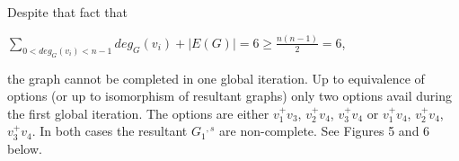 \documentclass[12pt]{amsart}
\numberwithin{equation}{section}
\numberwithin{equation}{section}
\begin{document}
Despite that fact that
\begin{center}
$\sum\limits_{0<deg_G(v_i) < n-1}deg_G(v_i) + |E(G)| = 6 \geq \frac{n(n-1)}{2} = 6$,
\end{center}
the graph cannot be completed in one global iteration. Up to equivalence of options (or up to isomorphism of resultant graphs) only two options avail during the first global iteration. The options are either $v^+_1v_3$, $v^+_2v_4$, $v^+_3v_4$ or $v^+_1v_4$, $v^+_2v_4$, $v^+_3v_4$. In both cases the resultant $G_1$$^{,s}$ are non-complete. See Figures 5 and 6 below.

\begin{figure}[h]
\centering
{}
\caption{}
\end{figure}

\begin{figure}[h]
\centering
{}
\caption{}
\end{figure}
\end{document}
